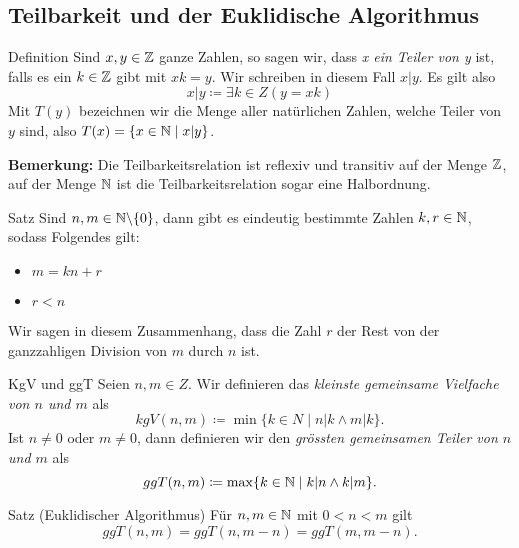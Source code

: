 \subsection{Teilbarkeit und der Euklidische Algorithmus}\label{subsec:teilbarkeit-und-der-euklidische-algorithmus}

\begin{definition}{Definition}
    Sind $x,y \in \mathbb{Z}$ ganze Zahlen, so sagen wir, dass \emph{x ein Teiler von y} ist, falls es ein $k \in \mathbb{Z}$ gibt mit $xk = y$.
    Wir schreiben in diesem Fall $x | y$.
    Es gilt also \[x | y \coloneqq \exists k \in Z \left( y = xk \right)\]
    Mit $T(y)$ bezeichnen wir die Menge aller natürlichen Zahlen, welche Teiler von $y$ sind, also $T(x) = \{ x \in \mathbb{N} \mid x | y \}$.
\end{definition}

\textbf{Bemerkung:} Die Teilbarkeitsrelation ist reflexiv und transitiv auf der Menge $\mathbb{Z}$, auf der Menge $\mathbb{N}$ ist die Teilbarkeitsrelation sogar eine Halbordnung.

\begin{definition}{Satz}
    Sind $n,m \in \mathbb{N} \backslash \{0\}$, dann gibt es eindeutig bestimmte Zahlen $k,r \in \mathbb{N}$, sodass Folgendes gilt:
    \begin{multicols}{2}
        \begin{itemize}
            \item $m = kn + r$
            \item $r < n$
        \end{itemize}
    \end{multicols}
    Wir sagen in diesem Zusammenhang, dass die Zahl $r$ der Rest von der ganzzahligen Division von $m$ durch $n$ ist.
\end{definition}

\begin{definition}{KgV und ggT}
    Seien $n,m \in Z$.
    Wir definieren das \emph{kleinste gemeinsame Vielfache von $n$ und $m$} als \[kgV(n,m) \coloneqq \min \{ k \in N \mid n|k \land m|k \}.\]
    Ist $n \neq 0$ oder $m \neq 0$, dann definieren wir den \emph{grössten gemeinsamen Teiler von $n$ und $m$} als \[ggT(n,m) \coloneqq \max \{ k \in \mathbb{N} \mid k|n \land k|m \}.\]
\end{definition}

\begin{definition}{Satz (Euklidischer Algorithmus)}
    Für $n,m \in \mathbb{N}$ mit $0 < n < m$ gilt \[ggT(n,m) = ggT(n,m-n) = ggT(m,m-n).\]
\end{definition}

